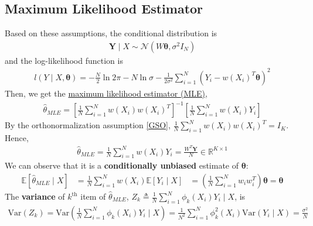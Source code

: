 \documentclass[11pt]{elegantbook}
\begin{document}
\subsection{Maximum Likelihood Estimator}
Based on these assumptions, the conditional distribution is
\begin{equation}
    \begin{aligned}
        \boldsymbol{Y}\mid X\sim \mathcal{N}(W \boldsymbol{\theta},\sigma^2 I_N)
    \end{aligned}
    \nonumber
\end{equation}
and the log-likelihood function is
\begin{equation}
    \begin{aligned}
        l(Y\mid X,\boldsymbol{\theta})=-\frac{N}{2}\ln 2\pi-N\ln\sigma-\frac{1}{2\sigma^2}\sum_{i=1}^N\left(Y_i-w(X_i)^T \boldsymbol{\theta}\right)^2
    \end{aligned}
    \nonumber
\end{equation}
Then, we get the \underline{maximum likelihood estimator (MLE)},
\begin{equation}
    \begin{aligned}
        \hat{\theta}_{MLE}=\left[\frac{1}{N}\sum_{i=1}^N w(X_i)w(X_i)^T\right]^{-1}\left[\frac{1}{N}\sum_{i=1}^N w(X_i)Y_i\right]
    \end{aligned}
    \nonumber
\end{equation}
By the orthonormalization assumption \ref{GSO}, $\frac{1}{N}\sum_{i=1}^N w(X_i)w(X_i)^T=I_{K}$.
Hence,
\begin{equation}
    \begin{aligned}
        \hat{\theta}_{MLE}=\frac{1}{N}\sum_{i=1}^N w(X_i)Y_i=\frac{W^T \boldsymbol{Y}}{N}\in \mathbb{R}^{K\times 1}
    \end{aligned}
    \nonumber
\end{equation}
We can observe that it is a \textbf{conditionally unbiased} estimate of $\boldsymbol{\theta}$:
\begin{equation}
    \begin{aligned}
        \mathbb{E}[\hat{\theta}_{MLE}\mid X]&=\frac{1}{N}\sum_{i=1}^N w(X_i)\mathbb{E}[Y_i\mid X]
        &=\left(\frac{1}{N}\sum_{i=1}^N w_iw_i^T\right)\boldsymbol{\theta}=\boldsymbol{\theta}
    \end{aligned}
    \nonumber
\end{equation}
The \textbf{variance} of $k^\text{th}$ item of $\hat{\theta}_{MLE}$, $Z_k\triangleq\frac{1}{N}\sum_{i=1}^N\phi_k(X_i)Y_i\mid X$, is
\begin{equation}
    \begin{aligned}
        \text{Var}(Z_k)=
        \text{Var}\left(\frac{1}{N}\sum_{i=1}^N\phi_k(X_i)Y_i\mid X\right)=\frac{1}{N^2}\sum_{i=1}^N\phi^2_k(X_i)\text{Var}\left(Y_i\mid X\right)=\frac{\sigma^2}{N}
    \end{aligned}
    \nonumber
\end{equation}
\end{document}
